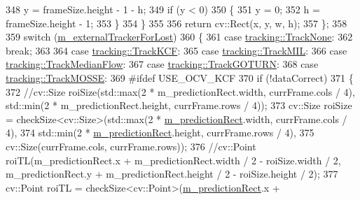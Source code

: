 \begin{DoxyCode}
348             y = frameSize.height - 1 - h;
349             \textcolor{keywordflow}{if} (y < 0)
350             \{
351                 y = 0;
352                 h = frameSize.height - 1;
353             \}
354         \}
355 
356         \textcolor{keywordflow}{return} cv::Rect(x, y, w, h);
357     \};
358 
359     \textcolor{keywordflow}{switch} (\mbox{\hyperlink{class_c_track_a7d1f6c9d8d56790a28a7139e85896dc8}{m\_externalTrackerForLost}})
360     \{
361     \textcolor{keywordflow}{case} \mbox{\hyperlink{namespacetracking_a5377d69122ad915004ef68a518d22be3a3bd92892a83828375b9fce502732c491}{tracking::TrackNone}}:
362         \textcolor{keywordflow}{break};
363 
364     \textcolor{keywordflow}{case} \mbox{\hyperlink{namespacetracking_a5377d69122ad915004ef68a518d22be3a9bba8e4377e562caa976576d47c5eb2e}{tracking::TrackKCF}}:
365     \textcolor{keywordflow}{case} \mbox{\hyperlink{namespacetracking_a5377d69122ad915004ef68a518d22be3a98b9586c66bb9e4b1e0fed027700a197}{tracking::TrackMIL}}:
366     \textcolor{keywordflow}{case} \mbox{\hyperlink{namespacetracking_a5377d69122ad915004ef68a518d22be3a637634260348d3b28ff4e28661bb417a}{tracking::TrackMedianFlow}}:
367     \textcolor{keywordflow}{case} \mbox{\hyperlink{namespacetracking_a5377d69122ad915004ef68a518d22be3a674ec8effe560545c87b0c14bd40f7f3}{tracking::TrackGOTURN}}:
368     \textcolor{keywordflow}{case} \mbox{\hyperlink{namespacetracking_a5377d69122ad915004ef68a518d22be3aa3948447c2ea9d8e9efef9b9433c70e2}{tracking::TrackMOSSE}}:
369 \textcolor{preprocessor}{#ifdef USE\_OCV\_KCF}
370         \textcolor{keywordflow}{if} (!dataCorrect)
371         \{
372             \textcolor{comment}{//cv::Size roiSize(std::max(2 * m\_predictionRect.width, currFrame.cols / 4), std::min(2 *
       m\_predictionRect.height, currFrame.rows / 4));}
373             cv::Size roiSize = checkSize<cv::Size>(std::max(2 * \mbox{\hyperlink{class_c_track_aeab9c3c95a6d988918f5874a8910b90b}{m\_predictionRect}}.width, 
      currFrame.cols / 4),
374                                                    std::min(2 * \mbox{\hyperlink{class_c_track_aeab9c3c95a6d988918f5874a8910b90b}{m\_predictionRect}}.height, 
      currFrame.rows / 4),
375                                                    cv::Size(currFrame.cols, currFrame.rows));
376             \textcolor{comment}{//cv::Point roiTL(m\_predictionRect.x + m\_predictionRect.width / 2 - roiSize.width / 2,
       m\_predictionRect.y + m\_predictionRect.height / 2 - roiSize.height / 2);}
377             cv::Point roiTL = checkSize<cv::Point>(\mbox{\hyperlink{class_c_track_aeab9c3c95a6d988918f5874a8910b90b}{m\_predictionRect}}.x + 

\end{DoxyCode}
